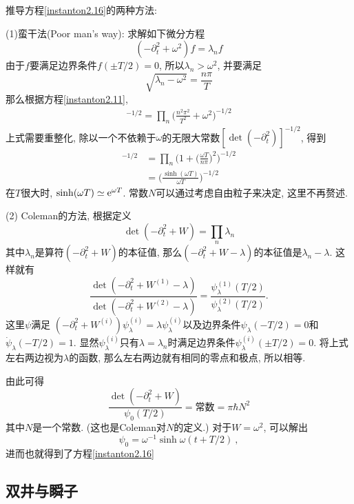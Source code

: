 \begin{tcolorbox}[breakable]
    推导方程\eqref{instanton2.16}的两种方法:

    (1)蛮干法(Poor man's way): 求解如下微分方程
\[
 (-\partial_{t}^{2}+\omega^{2})f= \lambda_{n}f
\]
由于$f$要满足边界条件$f(\pm T/2)=0$, 所以$\lambda_{n}>\omega^{2}$, 并要满足
\[
 \sqrt{\lambda_{n}-\omega^{2}} = \frac{n\pi}{T}    
\]
那么根据方程\eqref{instanton2.11}, 
\begin{align*}
    [\det(-\partial_{t}^{2}+\omega^{2})]^{-1/2}
    =\prod_{n}\biggl(\frac{n^{2}\pi^{2}}{T^{2}}+\omega^{2}\biggr)^{-1/2}
\end{align*}
上式需要重整化, 除以一个不依赖于$\omega$的无限大常数$[\det(-\partial_{t}^{2})]^{-1/2}$, 得到
\begin{align*}
    [\det(-\partial_{t}^{2}+\omega^{2})]^{-1/2}&=\prod_{n}\Biggl(
        1+ \biggl(\frac{\omega T}{n\pi}\biggr)^{2}\Biggr)^{-1/2} \\
        &= \biggl(\frac{\sinh(\omega T)}{\omega T}\biggr)^{-1/2}
\end{align*}
在$T$很大时, $\sinh(\omega T)\simeq \mathrm{e}^{\omega T}$. 常数$N$可以通过考虑自由粒子来决定, 这里不再赘述.

(2) Coleman的方法, 根据定义
\[
\det(-\partial_{t}^{2}+W)=\prod_{n}\lambda_{n}    
\]
其中$\lambda_{n}$是算符$(-\partial_{t}^{2}+W)$的本征值, 那么$(-\partial_{t}^{2}+W-\lambda)$的本征值是$\lambda_{n}-\lambda$. 这样就有
\[
\frac{\det(-\partial_{t}^{2}+W^{(1)}-\lambda)}{\det(-\partial_{t}^{2}+W^{(2)}-\lambda)}  = \frac{\psi_{\lambda}^{(1)}(T/2)}{\psi_{\lambda}^{(2)}(T/2)}  .
\]
这里$\psi$满足
$(-\partial_{t}^{2}+W^{(i)})\psi_{\lambda}^{(i)}=\lambda \psi_{\lambda}^{(i)}$以及边界条件$\psi_{\lambda}(-T/2)=0$和$\dot{\psi}_{\lambda}(-T/2)=1$. 显然$\psi_{\lambda}^{(i)}$只有$\lambda=\lambda_{n}$时满足边界条件$\psi_{\lambda}^{(i)}(\pm T/2)=0$. 将上式左右两边视为$\lambda$的函数, 那么左右两边就有相同的零点和极点, 所以相等.

由此可得
\[
    \frac{\det(-\partial_{t}^{2}+W)}{\psi_{0}(T/2)} =\text{常数} = \pi\hbar N^{2} 
\]
其中$N$是一个常数. (这也是Coleman对$N$的定义.) 对于$W=\omega^{2}$, 可以解出
\[
\psi_{0}=\omega^{-1} \sinh \omega(t+T/2)\:,   
\]
进而也就得到了方程\eqref{instanton2.16}

\end{tcolorbox}


\subsection{双井与瞬子} \label{instanton:sec2.2}

